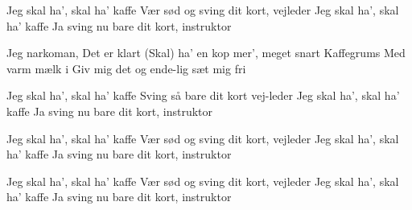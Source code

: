 \documentclass[a4paper,11pt]{article}
\begin{document}
\begin{song}
%
Jeg skal ha', skal ha' kaffe
Vær sød og sving dit kort, vejleder
Jeg skal ha', skal ha' kaffe
Ja sving nu bare dit kort, instruktor

%
Jeg narkoman,
Det er klart
(Skal) ha' en kop mer', meget snart
Kaffegrums
Med varm mælk i
Giv mig det og ende-lig sæt mig fri

%
Jeg skal ha', skal ha' kaffe
Sving så bare dit kort vej-leder
Jeg skal ha', skal ha' kaffe
Ja sving nu bare dit kort, instruktor

Jeg skal ha', skal ha' kaffe
Vær sød og sving dit kort, vejleder
Jeg skal ha', skal ha' kaffe
Ja sving nu bare dit kort, instruktor

Jeg skal ha', skal ha' kaffe
Vær sød og sving dit kort, vejleder
Jeg skal ha', skal ha' kaffe
Ja sving nu bare dit kort, instruktor
\end{song}
\end{document}
